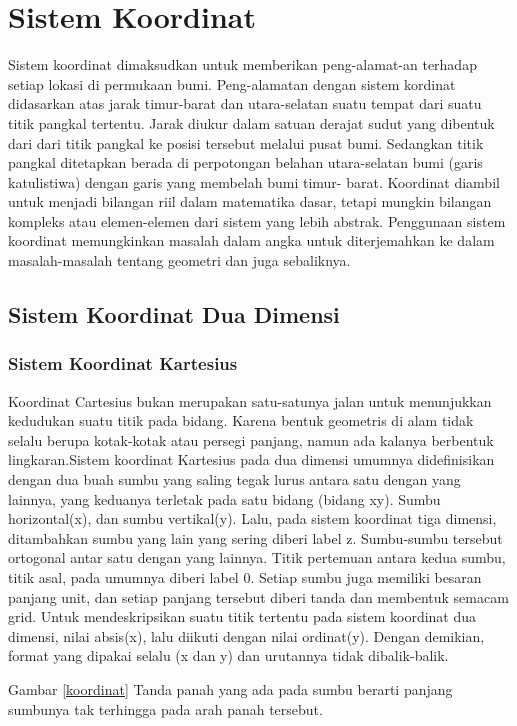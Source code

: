 \section{Sistem Koordinat}
Sistem koordinat dimaksudkan untuk memberikan peng-alamat-an terhadap setiap lokasi di permukaan bumi. Peng-alamatan dengan sistem kordinat didasarkan atas jarak timur-barat dan utara-selatan suatu tempat dari suatu titik pangkal tertentu. Jarak diukur dalam satuan derajat sudut yang dibentuk dari dari titik pangkal ke posisi tersebut melalui pusat bumi. Sedangkan titik pangkal ditetapkan berada di
perpotongan belahan utara-selatan bumi (garis katulistiwa) dengan garis yang membelah bumi timur- barat\cite{zuhdi2012sistem}. Koordinat diambil untuk menjadi bilangan riil dalam matematika dasar, tetapi mungkin bilangan kompleks atau elemen-elemen dari sistem yang lebih abstrak. Penggunaan sistem koordinat memungkinkan masalah dalam angka untuk diterjemahkan ke dalam masalah-masalah tentang geometri dan juga sebaliknya.

\subsection{Sistem Koordinat Dua Dimensi}
\subsubsection{Sistem Koordinat Kartesius}
Koordinat Cartesius bukan merupakan satu-satunya jalan untuk menunjukkan kedudukan suatu titik pada bidang. Karena bentuk geometris di alam tidak selalu berupa kotak-kotak atau persegi panjang, namun ada kalanya berbentuk lingkaran\cite{mufidah2015solusi}.Sistem koordinat Kartesius pada dua dimensi umumnya didefinisikan dengan dua buah sumbu yang saling tegak lurus antara satu dengan yang lainnya, yang keduanya terletak pada satu bidang (bidang xy). Sumbu horizontal(x), dan sumbu vertikal(y). Lalu, pada sistem koordinat tiga dimensi, ditambahkan sumbu yang lain yang sering diberi label z. Sumbu-sumbu tersebut ortogonal antar satu dengan yang lainnya. Titik pertemuan antara kedua sumbu, titik asal, pada umumnya diberi label 0. Setiap sumbu juga memiliki besaran panjang unit, dan setiap panjang tersebut diberi tanda dan membentuk semacam grid. Untuk mendeskripsikan suatu titik tertentu pada sistem koordinat dua dimensi, nilai absis(x), lalu diikuti dengan nilai ordinat(y). Dengan demikian, format yang dipakai selalu (x dan y) dan urutannya tidak dibalik-balik.

Gambar \ref{koordinat} Tanda panah yang ada pada sumbu berarti panjang sumbunya tak terhingga pada arah panah tersebut.

